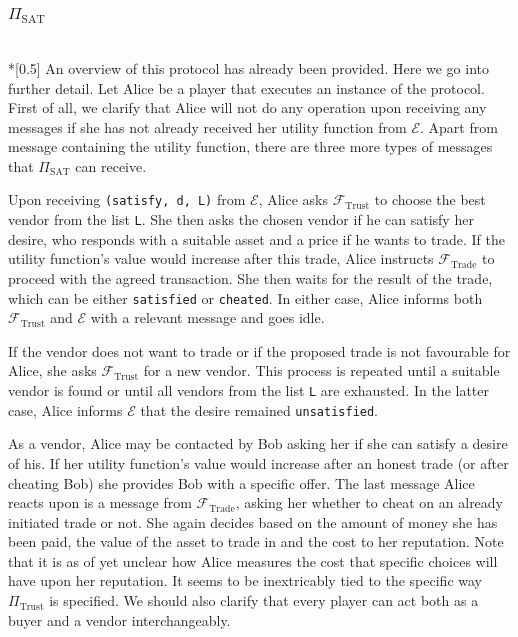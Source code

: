 \subsubsection{$\Pi_{\mathrm{SAT}}$} \ \\*[0.5\baselineskip]
  An overview of this protocol has already been provided. Here we go into further detail.
  Let Alice be a player that executes an instance of the protocol. First of all, we
  clarify that Alice will not do any operation upon receiving any messages if she has not
  already received her utility function from $\mathcal{E}$. Apart from message containing
  the utility function, there are three more types of messages that $\Pi_{\mathrm{SAT}}$
  can receive.

  Upon receiving \texttt{(satisfy, d, L)} from $\mathcal{E}$, Alice asks
  $\mathcal{F}_{\mathrm{Trust}}$ to choose the best vendor from the list \texttt{L}. She
  then asks the chosen vendor if he can satisfy her desire, who responds with a suitable
  asset and a price if he wants to trade. If the utility function's value would increase
  after this trade, Alice instructs $\mathcal{F}_{\mathrm{Trade}}$ to proceed with the
  agreed transaction. She then waits for the result of the trade, which can be either
  \texttt{satisfied} or \texttt{cheated}. In either case, Alice informs both
  $\mathcal{F}_{\mathrm{Trust}}$ and $\mathcal{E}$ with a relevant message and goes idle.

  If the vendor does not want to trade or if the proposed trade is not favourable for
  Alice, she asks $\mathcal{F}_{\mathrm{Trust}}$ for a new vendor. This process is
  repeated until a suitable vendor is found or until all vendors from the list \texttt{L}
  are exhausted. In the latter case, Alice informs $\mathcal{E}$ that the desire remained
  \texttt{unsatisfied}.

  As a vendor, Alice may be contacted by Bob asking her if she can satisfy a desire of
  his. If her utility function's value would increase after an honest trade (or after
  cheating Bob) she provides Bob with a specific offer. The last message Alice reacts upon
  is a message from $\mathcal{F}_{\mathrm{Trade}}$, asking her whether to cheat on an
  already initiated trade or not. She again decides based on the amount of money she has
  been paid, the value of the asset to trade in and the cost to her reputation. Note that
  it is as of yet unclear how Alice measures the cost that specific choices will have upon
  her reputation. It seems to be inextricably tied to the specific way
  $\Pi_{\mathrm{Trust}}$ is specified. We should also clarify that every player can act
  both as a buyer and a vendor interchangeably.
